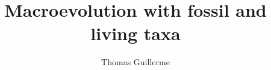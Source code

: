\documentclass[twoside,12pt]{mythesis}%
\title{Macroevolution with fossil and living taxa}
\author{Thomas Guillerme}
\begin{document}
\maketitle %






\allcontents %
 
\cleardoublepage
\mainbody

 
	


\formatbibliography 
 



%
%
\end{document}
